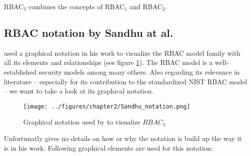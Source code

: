 \documentclass[twoside, openright, 12pt]{book}
\begin{document}
RBAC$_3$ combines the concepts of RBAC$_1$ and RBAC$_2$.





\subsection{RBAC notation by Sandhu at al.}
\label{RBAC_notation}
\cite{Sandhu96} used a graphical notation in his work to visualize the RBAC model family with all its elements and relationships (see figure \ref{fig:Sandhu_notation}).
The RBAC model is a well-established security models among many others.
Also regarding its relevance in literature -- especially for its contribution to the standardized NIST RBAC model \citep{RBACNIST} -- we want to take a look at its graphical notation.

\begin{figure}[htb]
	\centering
	\texttt{[image: ../figures/chapter2/Sandhu\_notation.png]}
	\caption{Graphical notation used by \cite{Sandhu96} to visualize $RBAC_3$}
	\label{fig:Sandhu_notation}
\end{figure}

\noindent
Unfortunatly \cite{Sandhu96} gives no details on how or why the notation is build up the way it is in his work.
Following graphical elements are used for this notation:
\end{document}
